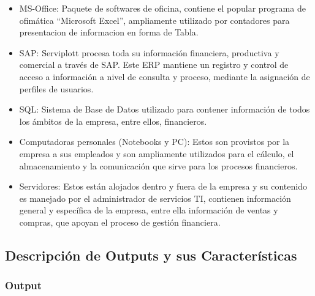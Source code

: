 {	
	\vspace{3mm}
	
	
	\begin{itemize}
	\item MS-Office: Paquete de softwares de oficina, contiene el popular programa de ofimática “Microsoft Excel”, ampliamente utilizado por contadores para presentacion de informacion en forma de Tabla.
	\item SAP: Serviplott procesa toda su información financiera, productiva y comercial a través de SAP. Este ERP mantiene un registro y control de acceso a información a nivel de consulta y proceso, mediante la asignación de perfiles de usuarios.
	\item SQL: Sistema de Base de Datos utilizado para contener información de todos los ámbitos de la empresa, entre ellos, financieros.
	\end{itemize}
	
	\vspace{3mm}
	
	
	\begin{itemize}
	\item Computadoras personales (Notebooks y PC): Estos son provistos por la empresa a sus empleados y son ampliamente utilizados para el cálculo, el almacenamiento y la comunicación que sirve para los procesos financieros.
	\item Servidores: Estos están alojados dentro y fuera de la empresa y su contenido es manejado por el administrador de servicios TI, contienen información general y específica de la empresa, entre ella información de ventas y compras, que apoyan el proceso de gestión financiera.
	\end{itemize}
	
	\subsection{Descripción de Outputs y sus Características}
	
	\subsubsection{Output}
	
	\\\\
	\\\\
	
}
